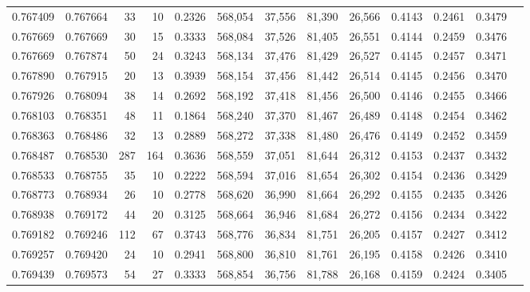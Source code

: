 \begin{tabular}{rrrrrrrrrrrrr}
0.767409 & 0.767664 &    33 &  10 &                                     0.2326 & 568,054 &  37,556 &  81,390 &  26,566 & 0.4143 & 0.2461 & 0.3479 \\
0.767669 & 0.767669 &    30 &  15 &                                     0.3333 & 568,084 &  37,526 &  81,405 &  26,551 & 0.4144 & 0.2459 & 0.3476 \\
0.767669 & 0.767874 &    50 &  24 &                                     0.3243 & 568,134 &  37,476 &  81,429 &  26,527 & 0.4145 & 0.2457 & 0.3471 \\
0.767890 & 0.767915 &    20 &  13 &                                     0.3939 & 568,154 &  37,456 &  81,442 &  26,514 & 0.4145 & 0.2456 & 0.3470 \\
0.767926 & 0.768094 &    38 &  14 &                                     0.2692 & 568,192 &  37,418 &  81,456 &  26,500 & 0.4146 & 0.2455 & 0.3466 \\
0.768103 & 0.768351 &    48 &  11 &                                     0.1864 & 568,240 &  37,370 &  81,467 &  26,489 & 0.4148 & 0.2454 & 0.3462 \\
0.768363 & 0.768486 &    32 &  13 &                                     0.2889 & 568,272 &  37,338 &  81,480 &  26,476 & 0.4149 & 0.2452 & 0.3459 \\
0.768487 & 0.768530 &   287 & 164 &                                     0.3636 & 568,559 &  37,051 &  81,644 &  26,312 & 0.4153 & 0.2437 & 0.3432 \\
0.768533 & 0.768755 &    35 &  10 &                                     0.2222 & 568,594 &  37,016 &  81,654 &  26,302 & 0.4154 & 0.2436 & 0.3429 \\
0.768773 & 0.768934 &    26 &  10 &                                     0.2778 & 568,620 &  36,990 &  81,664 &  26,292 & 0.4155 & 0.2435 & 0.3426 \\
0.768938 & 0.769172 &    44 &  20 &                                     0.3125 & 568,664 &  36,946 &  81,684 &  26,272 & 0.4156 & 0.2434 & 0.3422 \\
0.769182 & 0.769246 &   112 &  67 &                                     0.3743 & 568,776 &  36,834 &  81,751 &  26,205 & 0.4157 & 0.2427 & 0.3412 \\
0.769257 & 0.769420 &    24 &  10 &                                     0.2941 & 568,800 &  36,810 &  81,761 &  26,195 & 0.4158 & 0.2426 & 0.3410 \\
0.769439 & 0.769573 &    54 &  27 &                                     0.3333 & 568,854 &  36,756 &  81,788 &  26,168 & 0.4159 & 0.2424 & 0.3405 \\

\end{tabular}
